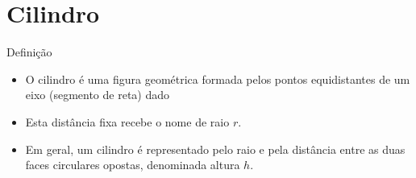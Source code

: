 \section{Cilindro}


\begin{frame}[fragile]{Definição}

    \begin{itemize}
        \item O cilindro é uma figura geométrica formada pelos pontos equidistantes de 
            um eixo (segmento de reta) dado

        \item Esta distância fixa recebe o nome de raio $r$.

        \item Em geral, um cilindro é representado pelo raio e pela distância entre as 
            duas faces circulares opostas, denominada altura $h$.

    \end{itemize}

    \begin{figure}
        \centering
    \end{figure}
\end{frame}

